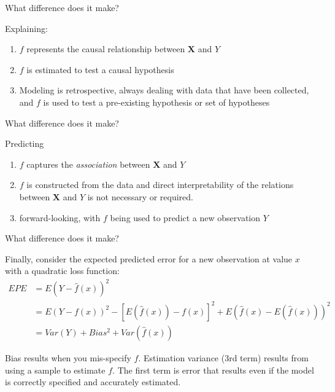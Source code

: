 \documentclass[
  12pt,
  ignorenonframetext,
]{beamer}
\providecommand{\tightlist}{%
  \setlength{\itemsep}{0pt}\setlength{\parskip}{0pt}}
\begin{document}
\begin{frame}{What difference does it make?}
\protect\hypertarget{what-difference-does-it-make}{}

Explaining:

\begin{enumerate}[<+->]
\tightlist
\item
  \(f\) represents the causal relationship between \(\boldsymbol{X}\)
  and \(Y\)
\item
  \(f\) is estimated to test a causal hypothesis
\item
  Modeling is retrospective, always dealing with data that have been
  collected, and \(f\) is used to test a pre-existing hypothesis or set
  of hypotheses
\end{enumerate}

\end{frame}

\begin{frame}{What difference does it make?}
\protect\hypertarget{what-difference-does-it-make-1}{}

Predicting

\begin{enumerate}[<+->]
\tightlist
\item
  \(f\) captures the \emph{association} between \(\boldsymbol{X}\) and
  \(Y\)
\item
  \(f\) is constructed from the data and direct interpretability of the
  relations between \(\boldsymbol{X}\) and \(Y\) is not necessary or
  required.
\item
  forward-looking, with \(f\) being used to predict a new observation
  \(Y\)
\end{enumerate}

\end{frame}

\begin{frame}{What difference does it make?}
\protect\hypertarget{what-difference-does-it-make-2}{}

Finally, consider the expected predicted error for a new observation at
value \(x\) with a quadratic loss function: \begin{align}
EPE &= E(Y-\hat{f}(x))^2\\
    &= E(Y-f(x))^2 - [E(\hat{f}(x))-f(x)]^2 + E(\hat{f}(x)-E(\hat{f}(x)))^2\\
    &= Var(Y) + Bias^2 + Var(\hat{f}(x))
\end{align}

Bias results when you mis-specify \(f\). Estimation variance (3rd term)
results from using a sample to estimate \(f\). The first term is error
that results even if the model is correctly specified and accurately
estimated.

\end{frame}
\end{document}

